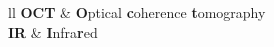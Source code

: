 \documentclass[
12pt, %
nolistspacing, %
liststotoc, %
headsepline, %
consistentlayout, %
]{MastersDoctoralThesis} %
\begin{document}
\tableofcontents %

\listoffigures %



\begin{abbreviations}{ll} %
\textbf{OCT} & \textbf{O}ptical \textbf{c}oherence \textbf{t}omography\\
\textbf{IR} & \textbf{I}nfra\textbf{r}ed\\
\end{abbreviations}









\end{document}
